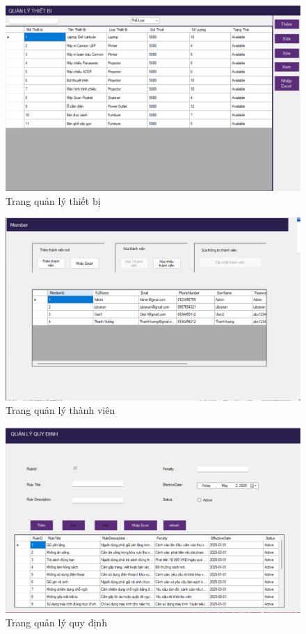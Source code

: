 \documentclass{article}
\begin{document}
\begin{figure} [H]
    \centering
    \includegraphics[width=1\linewidth]{images//Winform/page thiết bị.png}
    \caption{Trang quản lý thiết bị}
    \label{fig:enter-label}
\end{figure}

\begin{figure} [H]
    \centering
    \includegraphics[width=1\linewidth]{images//Winform/page thành viên.png}
    \caption{Trang quản lý thành viên}
    \label{fig:enter-label}
\end{figure}

\begin{figure} [H]
    \centering
    \includegraphics[width=1\linewidth]{images/Winform/page quy định.png}
    \caption{Trang quản lý quy định}
    \label{fig:enter-label}
\end{figure}
\end{document}
